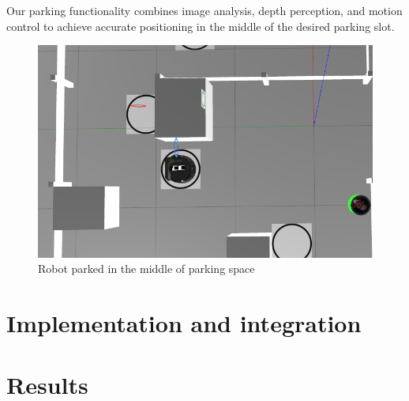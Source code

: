 \documentclass{article}
\begin{document}
Our parking functionality combines image analysis, depth perception, and motion control to achieve accurate positioning in the middle of the desired parking slot.

\begin{figure}[htbp]
  \centering
    \begin{minipage}[b]{0.80\textwidth}
    \centering
  \includegraphics[width=\textwidth]{images/parking.png}
  \caption{Robot parked in the middle of parking space}
  \label{fig:parking}
  \end{minipage}
\end{figure}

\section{Implementation and integration}

\section{Results}
\end{document}
